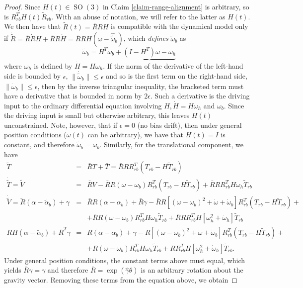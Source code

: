 \documentclass[]{article}
\def\w{\omega}
\def\ww{\tilde\w}
\def\SO{\operatorname{SO}}
\begin{document}
\begin{proof}
Since $H(t) \in \SO(3)$ in Claim \ref{claim-range-alignment} is arbitrary, so is $R_{rb}^T H(t) \tilde R_{rb}$. With an abuse of notation, we will refer to the latter as $H(t)$. We then have that $\tilde R(t) = \bar R R H$ is compatible with the dynamical model only if $\dot{\tilde R} = \bar R \dot R H + \bar R R \dot H = \bar R R H (\w - \widehat{\tilde  \w}_b)$, which {\em defines} $\ww_b$ as
\begin{equation}
\ww_b = H^T \w_b + \underbrace{(I-H^T)\w - \w_h}
\end{equation}
where $\w_h$ is defined by $\dot H = H\w_h$. If the norm of the derivative of the left-hand side is bounded by $\epsilon$, $\| \dot{\ww}_b \| \le \epsilon$ and so is the first term on the right-hand side, $\| \dot{\w}_b \| \le \epsilon$, then by the inverse triangular inequality, the bracketed term must have a derivative that is bounded in norm by $2\epsilon$. Such a derivative is the driving input to the ordinary differential equation involving $H, \dot H = H\w_h$ and $\w_b$. Since the driving input is small but otherwise arbitrary, this leaves $H(t)$ unconstrained. Note, however, that if $\epsilon = 0$ (no bias drift), then under general position conditions ($\w(t)$ can be arbitrary), we have that $H(t) = I$ is constant, and therefore $\tilde \w_b = \w_b$. Similarly, for the translational component, we have
\begin{eqnarray}
\tilde T &=& \bar R T + \bar T = \bar R R R_{rb}^T(T_{rb} - H \tilde T_{rb}) \\ 
\dot{\tilde T} = \tilde V &=& \bar R V - \bar R R(\w - \w_b)R_{rb}^T(T_{rb}-H\tilde T_{rb})+\bar R R R_{rb}^TH \w_h\tilde T_{rb} \\ 
\dot{\tilde V} = \tilde R(\alpha - \tilde \alpha_b) + \gamma &=& \bar R R(\alpha - \alpha_b) + \bar R \gamma - \bar R R[(\w - \w_b)^2 + \dot \w + \dot \w_b]R_{rb}^T(T_{rb}-H\tilde T_{rb}) +\\
&& +\bar R R(\w-\w_b)R_{rb}^TH\w_h\tilde T_{rb} + \bar R R R_{rb}^TH[\w_h^2+\dot \w_h]\tilde T_{rb}\\
R H(\alpha-\tilde \alpha_b) + \bar R^T\gamma &=& R(\alpha - \alpha_b) +  \gamma - R[(\w - \w_b)^2 + \dot \w + \dot \w_b]R_{rb}^T(T_{rb}-H\tilde T_{rb}) +\\
&& + R(\w-\w_b)R_{rb}^TH\w_h\tilde T_{rb} +  R R_{rb}^TH[\w_h^2+\dot \w_h]\tilde T_{rb}.
\end{eqnarray}
Under general position conditions, the constant terms above must equal, which yields $\bar R \gamma = \gamma$ and therefore $\bar R = \exp(\widehat \gamma \theta)$ is an arbitrary rotation about the gravity vector. Removing these terms from the equation above, we obtain

\end{proof}
\end{document}
